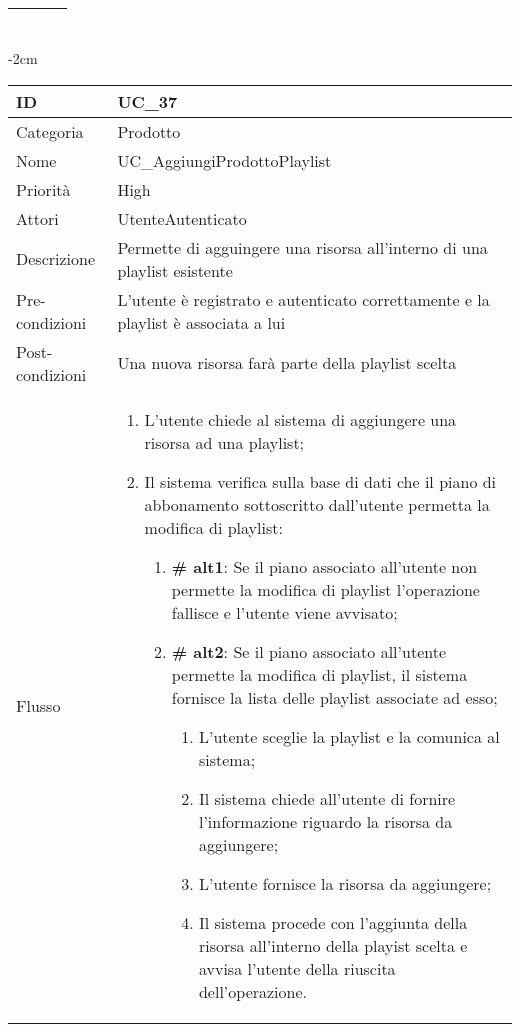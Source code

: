 \begin{center}
\begin{table}[bp]
\begin{tabular}{ |p{2.6cm}|p{13cm}|  }
\begin{enumerate}
		\end{enumerate}\\\hline
\end{tabular}
\label{table_use_case:36}\newline
\end{table}

\begin{table}[bp]
    \centering
    \addtolength{\leftskip} {-2cm}
\begin{tabular}{ |p{2.6cm}|p{13cm}|  }
\hline
ID & UC\_37 \\\hline
Categoria & Prodotto \\\hline
Nome & UC\_AggiungiProdottoPlaylist\\\hline
Priorità & High \\\hline
Attori &  UtenteAutenticato \\\hline
Descrizione & Permette di agguingere una risorsa all'interno di una playlist esistente\\\hline
Pre-condizioni & L'utente è registrato e autenticato correttamente e la playlist è associata a lui\\\hline
Post-condizioni & Una nuova risorsa farà parte della playlist scelta\\\hline
Flusso &  	\begin{enumerate}
\item L'utente chiede al sistema di aggiungere una risorsa ad una playlist;
		\item Il sistema verifica sulla base di dati che il piano di abbonamento sottoscritto dall'utente permetta la modifica di playlist:
		 \begin{enumerate}[label*=\arabic*.]
			\item \textbf{\# alt1}: Se il piano associato all'utente non permette la modifica di playlist l'operazione fallisce e l'utente viene avvisato;
			\item \textbf{\# alt2}: Se il piano associato all'utente permette la modifica di playlist, il sistema  fornisce la lista delle playlist associate ad esso;
			\begin{enumerate}[label*=\arabic*.]
				\item L'utente sceglie la playlist e la comunica al sistema;	
				\item Il sistema chiede all'utente di fornire l'informazione riguardo la risorsa da aggiungere;
				\item L'utente fornisce la risorsa da aggiungere;
				\item Il sistema procede con l'aggiunta della risorsa all'interno della playist scelta e avvisa l'utente della riuscita dell'operazione.
			\end{enumerate}
					\end{enumerate}


\end{enumerate}
\end{tabular}
\end{table}
\end{center}
